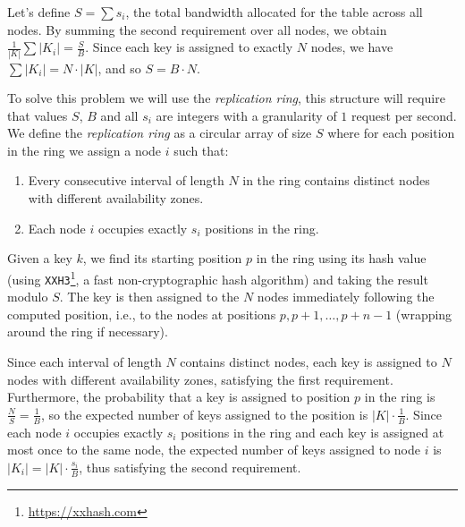 
Let's define $S = \sum s_i$, the total bandwidth allocated for the table across
all nodes.
By summing the second requirement over all nodes, we obtain $\frac{1}{|K|} \sum
|K_i| = \frac{S}{B}$.
Since each key is assigned to exactly $N$ nodes, we have $\sum |K_i| = N
\cdot |K|$, and so $S = B \cdot N$.

To solve this problem we will use the \emph{replication ring}, this structure
will require that values $S$, $B$ and all $s_i$ are integers with a granularity
of $1$ request per second.
We define the \emph{replication ring} as a circular array of size $S$ where for
each position in the ring we assign a node $i$ such that:

\begin{enumerate}
    \item Every consecutive interval of length $N$ in the ring contains
        distinct nodes with different availability zones.
    \item Each node $i$ occupies exactly $s_i$ positions in the ring.
\end{enumerate}

Given a key $k$, we find its starting position $p$ in the ring using its hash
value (using \texttt{XXH3}\footnote{\url{https://xxhash.com}}, a fast
non-cryptographic hash algorithm) and taking the result modulo $S$.
The key is then assigned to the $N$ nodes immediately following the
computed position, i.e., to the nodes at positions $p, p + 1, \dots, p + n - 1$
(wrapping around the ring if necessary).

Since each interval of length $N$ contains distinct nodes, each key is assigned
to $N$ nodes with different availability zones, satisfying the first
requirement.
Furthermore, the probability that a key is assigned to position $p$ in the ring
is $\frac{N}{S} = \frac{1}{B}$, so the expected number of keys assigned to the
position is $|K| \cdot \frac{1}{B}$.
Since each node $i$ occupies exactly $s_i$ positions in the ring and each key
is assigned at most once to the same node, the expected number of keys assigned
to node $i$ is $|K_i| = |K| \cdot \frac{s_i}{B}$, thus satisfying the second
requirement.

